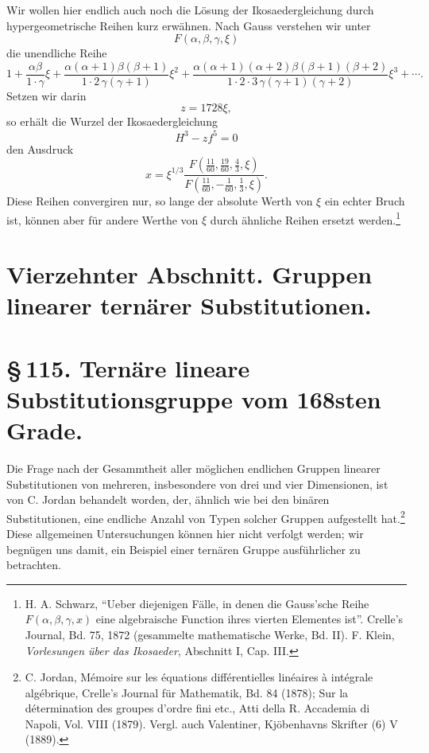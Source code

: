 \documentclass[11pt]{article}
\providecommand{\mat}[4]{\begin{pmatrix}#1&#2\\#3&#4\end{pmatrix}}
\providecommand{\mat}[4]{\begin{pmatrix}#1&#2\\#3&#4\end{pmatrix}}
\providecommand{\mat}[1]{\begin{pmatrix}#1\end{pmatrix}}
\begin{document}
Wir wollen hier endlich auch noch die Lösung der Ikosaedergleichung durch hypergeometrische Reihen kurz erwähnen. Nach Gauss verstehen wir unter
\[
F(\alpha,\beta,\gamma,\xi)
\]
die unendliche Reihe
\[
1+\frac{\alpha\beta}{1\cdot\gamma}\xi
+\frac{\alpha(\alpha+1)\beta(\beta+1)}{1\cdot2\,\gamma(\gamma+1)}\xi^2
+\frac{\alpha(\alpha+1)(\alpha+2)\beta(\beta+1)(\beta+2)}{1\cdot2\cdot3\,\gamma(\gamma+1)(\gamma+2)}\xi^3+\cdots .
\]
Setzen wir darin
\[
z=1728\xi,
\]
so erhält die Wurzel der Ikosaedergleichung
\[
H^3-zf^5=0
\]
den Ausdruck
\begin{equation}
x=\xi^{1/3}\frac{F\left(\frac{11}{60},\frac{19}{60},\frac{4}{3},\xi\right)}{F\left(\frac{11}{60},-\frac1{60},\frac{1}{3},\xi\right)}.
\tag{14}
\end{equation}
Diese Reihen convergiren nur, so lange der absolute Werth von \(\xi\) ein echter Bruch ist, können aber für andere Werthe von \(\xi\) durch ähnliche Reihen ersetzt werden.\footnote{H. A. Schwarz, ``Ueber diejenigen Fälle, in denen die Gauss'sche Reihe \(F(\alpha,\beta,\gamma,x)\) eine algebraische Function ihres vierten Elementes ist''. Crelle's Journal, Bd. 75, 1872 (gesammelte mathematische Werke, Bd. II). F. Klein, \emph{Vorlesungen über das Ikosaeder}, Abschnitt I, Cap. III.}


\clearpage
\renewcommand{\mat}[1]{\begin{pmatrix}#1\end{pmatrix}}
\section*{Vierzehnter Abschnitt. Gruppen linearer ternärer Substitutionen.}

\section*{\S\,115. Ternäre lineare Substitutionsgruppe vom 168sten Grade.}

Die Frage nach der Gesammtheit aller möglichen endlichen Gruppen linearer Substitutionen von mehreren, insbesondere von drei und vier Dimensionen, ist von C. Jordan behandelt worden, der, ähnlich wie bei den binären Substitutionen, eine endliche Anzahl von Typen solcher Gruppen aufgestellt hat.\footnote{C. Jordan, Mémoire sur les équations différentielles linéaires à intégrale algébrique, Crelle's Journal für Mathematik, Bd. 84 (1878); Sur la détermination des groupes d'ordre fini etc., Atti della R. Accademia di Napoli, Vol. VIII (1879). Vergl. auch Valentiner, Kjöbenhavns Skrifter (6) V (1889).} Diese allgemeinen Untersuchungen können hier nicht verfolgt werden; wir begnügen uns damit, ein Beispiel einer ternären Gruppe ausführlicher zu betrachten.
\end{document}

